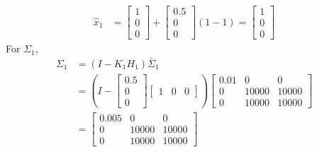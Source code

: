 \documentclass[answers]{exam}
\begin{document}
\begin{questions}
\begin{parts}
\begin{solution}
            \begin{align*}
                \hat{x}_1 & = \begin{bmatrix}
                                  1 \\ 0 \\ 0
                              \end{bmatrix} + \begin{bmatrix}
                                                  0.5 \\ 0 \\ 0
                                              \end{bmatrix} \left(1 - 1\right)
                = \begin{bmatrix}
                      1 \\ 0 \\ 0
                  \end{bmatrix}
            \end{align*}
            For $\Sigma_1$,
            \begin{align*}
                \Sigma_1 & = \left(I - K_1 H_1\right) \bar{\Sigma}_1                           \\
                         & = \left(I - \begin{bmatrix}
                                               0.5 \\ 0 \\ 0
                                           \end{bmatrix} \begin{bmatrix}
                                                             1 & 0 & 0
                                                         \end{bmatrix}\right) \begin{bmatrix}
                                                                              0.01 & 0     & 0     \\
                                                                              0    & 10000 & 10000 \\
                                                                              0    & 10000 & 10000
                                                                          \end{bmatrix} \\
                         & = \begin{bmatrix}
                                 0.005 & 0     & 0     \\
                                 0     & 10000 & 10000 \\
                                 0     & 10000 & 10000
                             \end{bmatrix}
            \end{align*}
        \end{solution}


\end{parts}
\end{questions}
\end{document}
